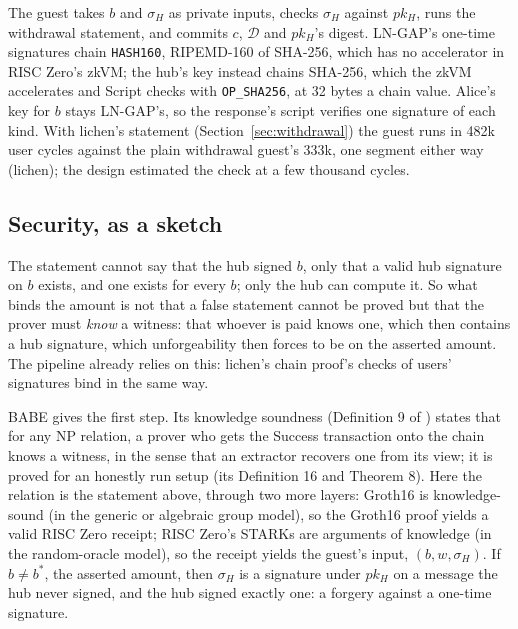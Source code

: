 \documentclass[11pt]{article}
\begin{document}
The guest takes $b$ and $\sigma_H$ as private inputs, checks $\sigma_H$
against $pk_H$, runs the withdrawal statement, and commits $c$,
$\mathcal{D}$ and $pk_H$'s digest. LN-GAP's one-time signatures chain
\texttt{HASH160}, RIPEMD-160 of SHA-256, which has no accelerator in RISC
Zero's zkVM; the hub's key instead chains SHA-256, which the zkVM
accelerates and Script checks with \texttt{OP\_SHA256}, at 32 bytes a
chain value. Alice's key for $b$ stays LN-GAP's, so the response's
script verifies one signature of each kind. With lichen's statement
(Section~\ref{sec:withdrawal}) the guest runs in 482k user cycles
against the plain withdrawal guest's 333k, one segment either way
(lichen); the design estimated the check at a few thousand cycles.

\subsection{Security, as a sketch}
\label{sec:security}

The statement cannot say that the hub signed $b$, only that a valid hub
signature on $b$ exists, and one exists for every $b$; only the hub can
compute it. So what binds the amount is not that a false statement
cannot be proved but that the prover must \emph{know} a witness: that
whoever is paid knows one, which then contains a hub signature, which
unforgeability then forces to be on the asserted amount. The pipeline
already relies on this: lichen's chain proof's checks of users'
signatures bind in the same way.

BABE gives the first step. Its knowledge soundness (Definition 9 of
\cite{babe}) states that for any NP relation, a prover who gets the
Success transaction onto the chain knows a witness, in the sense that an
extractor recovers one from its view; it is proved for an honestly run
setup (its Definition 16 and Theorem 8). Here the relation is the
statement above, through two more layers: Groth16 is knowledge-sound
(in the generic or algebraic group model), so the Groth16 proof yields
a valid RISC Zero receipt; RISC Zero's STARKs are arguments of knowledge
(in the random-oracle model), so the receipt yields the guest's input,
$(b, w, \sigma_H)$. If $b \ne b^*$, the asserted amount, then $\sigma_H$
is a signature under $pk_H$ on a message the hub never signed, and the
hub signed exactly one: a forgery against a one-time signature.
\end{document}
